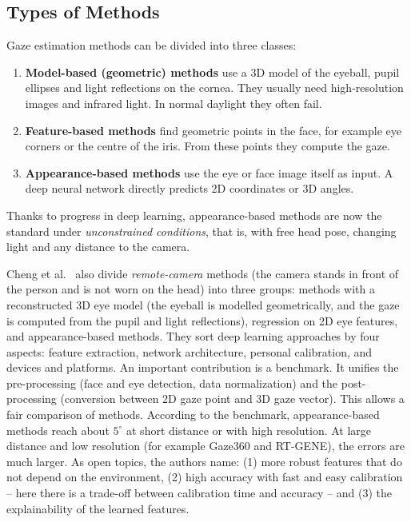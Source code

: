 \subsection{Types of Methods}
\label{subsec:taxonomie}
Gaze estimation methods can be divided into three classes:
\begin{enumerate}
  \item \textbf{Model-based (geometric) methods} use a 3D model of the
        eyeball, pupil ellipses and light reflections on the cornea. They
        usually need high-resolution images and infrared light. In normal
        daylight they often fail.
  \item \textbf{Feature-based methods} find geometric points in the face, for
        example eye corners or the centre of the iris. From these points they
        compute the gaze.
  \item \textbf{Appearance-based methods} use the eye or face image itself as
        input. A deep neural network directly predicts 2D coordinates or 3D
        angles.
\end{enumerate}
Thanks to progress in deep learning, appearance-based methods are now the
standard under \emph{unconstrained conditions}, that is, with free head pose,
changing light and any distance to the camera.

Cheng et al.~\cite{cheng2024review} also divide \emph{remote-camera} methods
(the camera stands in front of the person and is not worn on the head) into
three groups: methods with a reconstructed 3D eye model (the eyeball is
modelled geometrically, and the gaze is computed from the pupil and light
reflections), regression on 2D eye features, and appearance-based methods. They sort deep learning approaches by
four aspects: feature extraction, network architecture, personal calibration,
and devices and platforms. An important contribution is a benchmark. It unifies
the pre-processing (face and eye detection, data normalization) and the
post-processing (conversion between 2D gaze point and 3D gaze vector). This
allows a fair comparison of methods. According to the benchmark,
appearance-based methods reach about $5^\circ$ at short distance or with high
resolution. At large distance and low resolution (for example Gaze360 and
RT-GENE), the errors are much larger. As open topics, the authors name: (1)
more robust features that do not depend on the environment, (2) high accuracy
with fast and easy calibration -- here there is a trade-off between
calibration time and accuracy -- and (3) the explainability of the learned
features.


